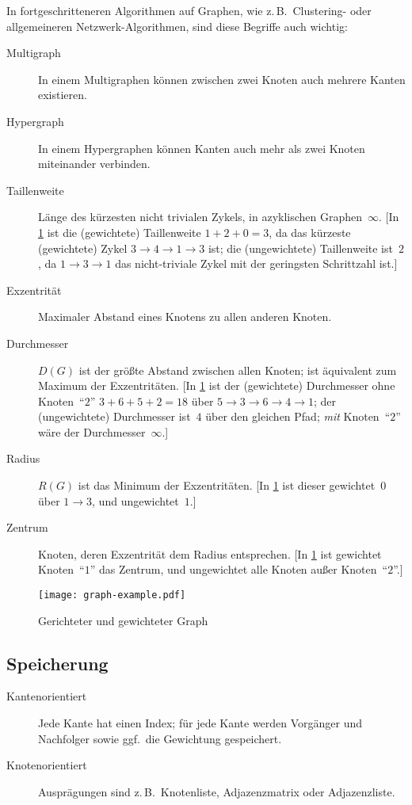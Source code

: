 In fortgeschritteneren Algorithmen auf Graphen, wie z.\,B.~Clustering- oder allgemeineren Netzwerk-Algorithmen, sind diese Begriffe auch wichtig:
\begin{description}
    \item[Multigraph] In einem Multigraphen können zwischen zwei Knoten auch mehrere Kanten existieren.
    \item[Hypergraph] In einem Hypergraphen können Kanten auch mehr als zwei Knoten miteinander verbinden.
    \item[Taillenweite] Länge des kürzesten nicht trivialen Zykels, in azyklischen Graphen~$\infty$.
        [In \cref{fig:Graph} ist die (gewichtete) Taillenweite $1+2+0=3$, da das kürzeste (gewichtete) Zykel $3 \longrightarrow 4 \longrightarrow 1 \longrightarrow 3$ ist; die (ungewichtete) Taillenweite ist~$2$, da $1 \longrightarrow 3 \longrightarrow 1$ das nicht-triviale Zykel mit der geringsten Schrittzahl ist.]
    \item[Exzentrität] Maximaler Abstand eines Knotens zu allen anderen Knoten.
    \item[Durchmesser] $D(G)$ ist der größte Abstand zwischen allen Knoten; ist äquivalent zum Maximum der Exzentritäten.
        [In \cref{fig:Graph} ist der (gewichtete) Durchmesser ohne Knoten~\enquote{$2$} $3+6+5+2=18$ über $5 \longrightarrow 3 \longrightarrow 6 \longrightarrow 4 \longrightarrow 1$; der (ungewichtete) Durchmesser ist~$4$ über den gleichen Pfad; \emph{mit} Knoten~\enquote{$2$} wäre der Durchmesser~$\infty$.]
    \item[Radius] $R(G)$ ist das Minimum der Exzentritäten.
        [In \cref{fig:Graph} ist dieser gewichtet~$0$ über $1 \longrightarrow 3$, und ungewichtet~$1$.]
    \item[Zentrum] Knoten, deren Exzentrität dem Radius entsprechen.
        [In \cref{fig:Graph} ist gewichtet Knoten~\enquote{$1$} das Zentrum, und ungewichtet alle Knoten außer Knoten~\enquote{$2$}.]
\end{description}

\begin{figure}[htb]
\centering\texttt{[image: graph-example.pdf]}

\caption{Gerichteter und gewichteter Graph\label{fig:Graph}}
\end{figure}

\subsection{Speicherung}
\begin{description}
  \item[Kantenorientiert] Jede Kante hat einen Index; für jede Kante werden Vorgänger und Nachfolger sowie ggf.~die Gewichtung gespeichert.
  \item[Knotenorientiert] Ausprägungen sind z.\,B.~Knotenliste, Adjazenzmatrix oder Adjazenzliste.
\end{description}

